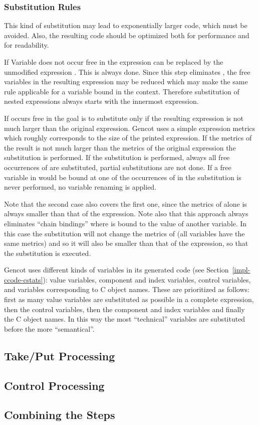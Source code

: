 \subsubsection{Substitution Rules}

This kind of substitution may lead to exponentially larger code, which must be avoided. Also, the resulting code should be 
optimized both for performance and for readability. 

If Variable  does not occur free in  the  expression can be replaced by the unmodified 
expression . This is always done. Since this step eliminates , the free variables in the resulting expression may be 
reduced which may make the same rule applicable for a variable bound in the context. Therefore substitution of nested
 expressions always starts with the innermost  expression.

If  occurs free in  the goal is to substitute only if the resulting expression is not much larger than 
the original expression. Gencot uses a simple expression metrics which roughly corresponds to the size of the printed expression.
If the metrics of the result is not much larger than the metrics of the original  expression the substitution is 
performed. If the substitution is performed, always all free occurrences of  are substituted, partial substitutions are 
not done. If a free variable in  would be bound at one of the occurrences of  in  the substitution 
is never performed, no variable renaming is applied.

Note that the second case also covers the first one, since the metrics of  alone is always smaller than that of the 
 expression. Note also that this approach always eliminates ``chain bindings'' where  is bound to the value of another
variable. In this case the substitution will not change the metrics of  (all variables have the same metrics) and so it 
will also be smaller than that of the  expression, so that the substitution is executed.

Gencot uses different kinds of variables in its generated code (see Section~\ref{impl-ccode-cstats}): value variables, component and 
index variables, control variables, and variables corresponding to C object names. These are prioritized as follows: first as many value 
variables are substituted as possible in a complete expression, then the control variables, then the component and index variables and
finally the C object names. In this way the most ``technical'' variables are substituted before the more ``semantical''.

\subsection{Take/Put Processing}
\label{imp-post-takeput}

\subsection{Control Processing}
\label{imp-post-control}

\subsection{Combining the Steps}
\label{imp-post-combine}

